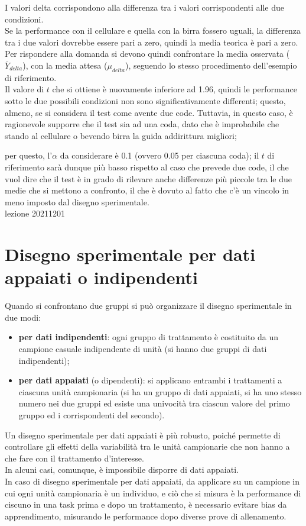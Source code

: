 \documentclass[10pt, draft]{book}
\newcommand{\tightlist}{%
\setlength{\itemsep}{1pt}\setlength{\parskip}{0pt}\setlength{\parsep}{0pt}}
\begin{document}
I valori delta corrispondono alla differenza tra i valori corrispondenti alle due condizioni.
\\
Se la performance con il cellulare e quella con la birra fossero uguali, la differenza tra i due valori dovrebbe essere pari a zero, quindi la media teorica è pari a zero.
\\
Per rispondere alla domanda si devono quindi confrontare la media osservata ($\overline{Y}_{delta}$), con la media attesa ($\mu_{delta}$), seguendo lo stesso procedimento dell'esempio di riferimento.
\\
Il valore di $t$ che si ottiene è nuovamente inferiore ad 1.96, quindi le performance sotto le due possibili condizioni non sono significativamente differenti; questo, almeno, se si considera il test come avente due code. Tuttavia, in questo caso, è ragionevole supporre che il test sia ad una coda, dato che è improbabile che stando al cellulare o bevendo birra la guida addirittura migliori; \colorbox{lyellow}{\parbox{0.98\textwidth}{per questo, l'$\alpha$ da considerare è 0.1 (ovvero 0.05 per ciascuna coda); il $t$ di riferimento sarà dunque più basso rispetto al caso che prevede due code, il che vuol dire che il test è in grado di rilevare anche differenze più piccole tra le due medie che si mettono a confronto, il che è dovuto al fatto che c'è un vincolo in meno imposto dal disegno sperimentale.
\\
lezione 20211201}}

\section{Disegno sperimentale per dati appaiati o indipendenti}

Quando si confrontano due gruppi si può organizzare il disegno sperimentale in due modi:
\begin{itemize} \tightlist
    \item \textbf{per dati indipendenti}: ogni gruppo di trattamento è costituito da un campione casuale indipendente di unità (si hanno due gruppi di dati indipendenti);
    \item \textbf{per dati appaiati} (o dipendenti): si applicano entrambi i trattamenti a ciascuna unità campionaria (si ha un gruppo di dati appaiati, si ha uno stesso numero nei due gruppi ed esiste una univocità tra ciascun valore del primo gruppo ed i corrispondenti del secondo).
\end{itemize}
Un disegno sperimentale per dati appaiati è più robusto, poiché permette di controllare gli effetti della variabilità tra le unità campionarie che non hanno a che fare con il trattamento d'interesse.
\\
In alcuni casi, comunque, è impossibile disporre di dati appaiati.
\\
In caso di disegno sperimentale per dati appaiati, da applicare su un campione in cui ogni unità campionaria è un individuo, e ciò che si misura è la performance di ciscuno in una task prima e dopo un trattamento, è necessario evitare bias da apprendimento, misurando le performance dopo diverse prove di allenamento.
\end{document}
